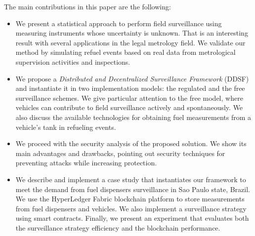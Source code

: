 \documentclass[sigplan]{acmart}
\begin{document}
The main contributions in this paper are the following:
\begin{itemize}
 \item We present a statistical approach to perform field surveillance using measuring instruments whose uncertainty is unknown. That is an interesting result with several applications in the legal metrology field. We validate our method by simulating refuel events based on real data from metrological supervision activities and inspections.
 \item We propose a \textit{Distributed and Decentralized Surveillance Framework} (DDSF) and instantiate it in two implementation models: the regulated and the free surveillance schemes. We give particular attention to the free model, where vehicles can contribute to field surveillance actively and spontaneously. We also discuss the available technologies for obtaining fuel measurements from a vehicle's tank in refueling events.
 \item We proceed with the security analysis of the proposed solution. We show its main advantages and drawbacks, pointing out security techniques for preventing attacks while increasing protection.
 \item We describe and implement a case study that instantiates our framework to meet the demand from fuel dispensers surveillance in Sao Paulo state, Brazil. We use the HyperLedger Fabric blockchain platform to store measurements from fuel dispensers and vehicles. We also implement a surveillance strategy using smart contracts.
 Finally, we present an experiment that evaluates both the surveillance strategy efficiency and the blockchain performance.
\end{itemize}
% 
% 
% 
% 
% 
% 
% 
\end{document}
